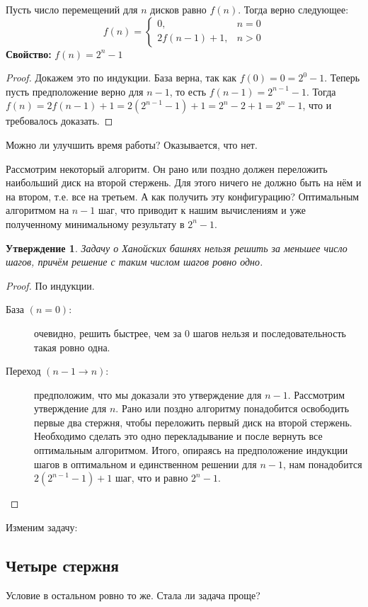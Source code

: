 \documentclass[12pt,a4paper]{article}
\newtheorem*{minimal_steps}{Утверждение}
\begin{document}
Пусть число перемещений для $n$ дисков равно $f(n)$. Тогда верно следующее: \[f(n) = \begin{cases}0, &n=0\\2f(n-1)+1, &n>0\end{cases}\]
\textbf{Свойство:} \textit{$f(n) = 2^n - 1$}
\begin{proof} Докажем это по индукции. База верна, так как $f(0) = 0 = 2^0 - 1$. Теперь пусть предположение верно для $n - 1$, то есть $f(n - 1) = 2^{n - 1} - 1$. Тогда $f(n) = 2f(n - 1) + 1 = 2(2^{n - 1} - 1) + 1 = 2^n - 2 + 1 = 2^n - 1$, что и требовалось доказать. \end{proof}

Можно ли улучшить время работы? Оказывается, что нет.

Рассмотрим некоторый алгоритм. Он рано или поздно должен переложить наибольший диск на второй стержень. Для этого ничего не должно быть на нём и на втором, т.е. все на третьем. А как получить эту конфигурацию? Оптимальным алгоритмом на $n-1$ шаг, что приводит к нашим вычислениям и уже полученному минимальному результату в $2^n-1$.

\begin{minimal_steps}
Задачу о Ханойских башнях нельзя решить за меньшее число шагов, причём решение с таким числом шагов ровно одно.
\end{minimal_steps}
\begin{proof}
По индукции.
\begin{description}
\item[База $(n = 0)$:] очевидно, решить быстрее, чем за 0 шагов нельзя и последовательность такая ровно одна.

\item[Переход $(n - 1 \to n)$:] предположим, что мы доказали это утверждение для $n-1$. Рассмотрим утверждение для $n$. Рано или поздно алгоритму понадобится освободить первые два стержня, чтобы переложить первый диск на второй стержень. Необходимо сделать это одно перекладывание и после вернуть все оптимальным алгоритмом. Итого, опираясь на предположение индукции шагов в оптимальном и единственном решении для $n-1$, нам понадобится $2(2^{n-1} - 1) + 1$ шаг, что и равно $2^n -1$. \qedhere
\end{description}
\end{proof}

Изменим задачу:
\subsection*{Четыре стержня}
Условие в остальном ровно то же. 
Стала ли задача проще?
\end{document}
